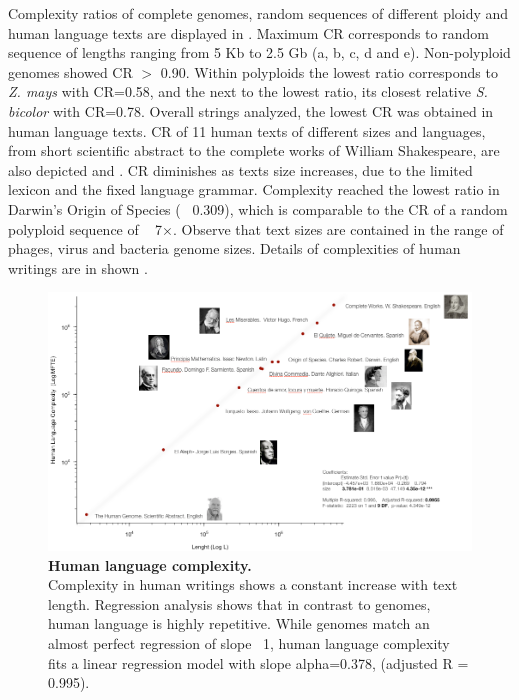 Complexity ratios of complete genomes, random sequences of different ploidy and human language texts are displayed in . Maximum CR corresponds to random sequence of lengths ranging from 5 Kb to 2.5 Gb (a, b, c, d and e). Non-polyploid genomes showed CR $>$ 0.90. Within polyploids the lowest ratio corresponds to \textit{Z. mays} with CR=0.58, and the next to the lowest ratio, its closest relative \textit{S. bicolor} with CR=0.78. Overall strings analyzed, the lowest CR was obtained in human language texts. CR of 11 human texts of different sizes and languages, from short scientific abstract to the complete works of William Shakespeare, are also depicted  and . CR diminishes as texts size increases, due to the limited lexicon and the fixed language grammar. Complexity reached the lowest ratio in Darwin's Origin of Species (~ 0.309), which is comparable to the CR of a random polyploid sequence of ~ 7$\times$. Observe that text sizes are contained in the range of phages, virus and bacteria genome sizes. Details of complexities of human writings are in shown .

\begin{figure}[htpb] 
\centering
\includegraphics[width=\textwidth]{tex_source/figures/dna_struct/language_complexity.png}
\caption[Human language complexity]{{\bf Human language complexity.} \\
Complexity in human writings shows a constant increase with text length. Regression analysis shows that in contrast to genomes, human language is highly repetitive. While genomes match an almost perfect regression of slope ~1, human language complexity fits a linear regression model with slope alpha=0.378, (adjusted R = 0.995).}
\label{fig:lang_compl}
\end{figure}

